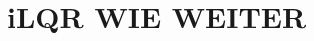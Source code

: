 \documentclass[12pt, a4paper]{article}
\begin{document}
\newpage

\section{iLQR WIE WEITER}

%
%
%
%
\end{document}
